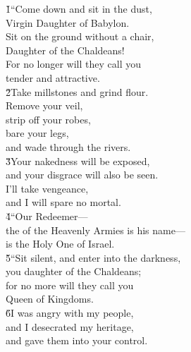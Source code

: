 \begin{poetry}
\poeml {}
\v{1}``Come down and sit in the dust, \\
\poemll    Virgin Daughter of Babylon. \\
\poeml Sit on the ground without a chair, \\
\poemll    Daughter of the Chaldeans! \\
\poeml For no longer will they call you \\
\poemll    tender and attractive. \\
\poeml \v{2}Take millstones and grind flour. \\
\poemll    Remove your veil, \\
\poeml strip off your robes, \\
\poemll    bare your legs, \\
\poemlll       and wade through the rivers. \\
\poeml \v{3}Your nakedness will be exposed, \\
\poemll    and your disgrace will also be seen. \\
\poeml I'll take vengeance, \\
\poemll    and I will spare no mortal. \\
\poeml \v{4}``Our Redeemer--- \\
\poemll    the  of the Heavenly Armies is his name--- \\
\poemlll       is the Holy One of Israel. \\
\poeml \v{5}``Sit silent, and enter into the darkness, \\
\poemll    you daughter of the Chaldeans; \\
\poeml for no more will they call you \\
\poemll    Queen of Kingdoms. \\
\poeml \v{6}I was angry with my people, \\
\poemll    and I desecrated my heritage, \\
\poeml and gave them into your control. \\

\end{poetry}
